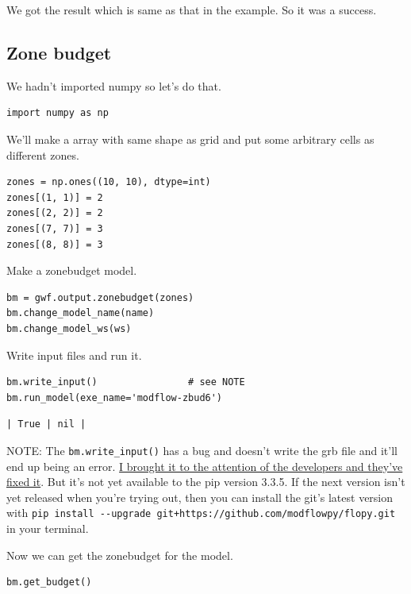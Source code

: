 \documentclass[titlepage,12pt]{unisubmission}
\begin{document}
We got the result which is same as that in the example. So it was a success.

\subsection{Zone budget}
\label{sec:org13d2fc5}
We hadn't imported numpy so let's do that.

\begin{verbatim}
import numpy as np
\end{verbatim}

We'll make a array with same shape as grid and put some arbitrary cells as different zones.

\begin{verbatim}
zones = np.ones((10, 10), dtype=int)
zones[(1, 1)] = 2
zones[(2, 2)] = 2
zones[(7, 7)] = 3
zones[(8, 8)] = 3
\end{verbatim}

Make a zonebudget model.

\begin{verbatim}
bm = gwf.output.zonebudget(zones)
bm.change_model_name(name)
bm.change_model_ws(ws)
\end{verbatim}

Write input files and run it.

\begin{verbatim}
bm.write_input()                # see NOTE
bm.run_model(exe_name='modflow-zbud6')
\end{verbatim}

\begin{verbatim}
| True | nil |
\end{verbatim}

NOTE: The \texttt{bm.write\_input()} has a bug and doesn't write the grb file and it'll end up being an error. \href{https://github.com/modflowpy/flopy/issues/1395}{I brought it to the attention of the developers and they've fixed it}. But it's not yet available to the pip version 3.3.5. If the next version isn't yet released when you're trying out, then you can install the git's latest version with \texttt{pip install -{}-upgrade git+https://github.com/modflowpy/flopy.git} in your terminal.

Now we can get the zonebudget for the model.

\begin{verbatim}
bm.get_budget()
\end{verbatim}
\end{document}

